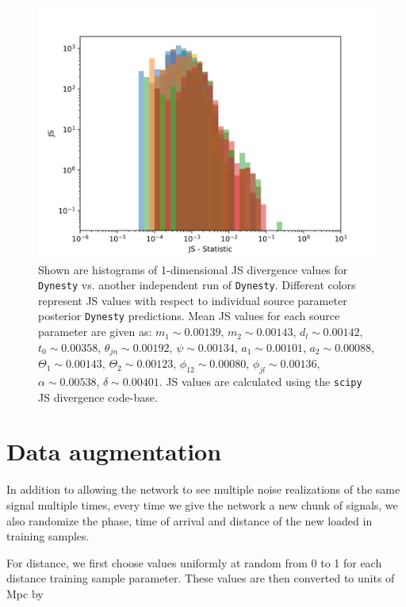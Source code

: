 %
%

\begin{figure}
    \includegraphics[width=\columnwidth]{figures/dynesty-dynesty_indiJS.png}
    \caption[Dynesty vs. Dynesty full 1-D JS divergence histogram plot.]{\label{fig:dyn_vs_dyn_ful14D_JS} Shown are histograms of 1-dimensional JS divergence values for \texttt{Dynesty} vs. another independent run of \texttt{Dynesty}. Different colors represent JS values with respect to individual source parameter posterior \texttt{Dynesty} predictions. Mean JS values for each source parameter are given as: $m_1 \sim 0.00139$, $m_2 \sim 0.00143$, $d_l \sim 0.00142$, $t_0 \sim 0.00358$, $\theta_{jn} \sim 0.00192$, $\psi \sim 0.00134$, $a_1 \sim 0.00101$, $a_2 \sim 0.00088$, $\Theta_1 \sim 0.00143$, $\Theta_2 \sim 0.00123$, $\phi_{12} \sim 0.00080$, $\phi_{jl} \sim 0.00136$, $\alpha \sim 0.00538$, $\delta \sim 0.00401$. JS values are calculated using the \texttt{scipy} JS divergence code-base. }
\end{figure}

\section{Data augmentation}\label{sec:vit_data_aug}

In addition to allowing the network to see multiple noise realizations 
of the same signal multiple times, every time we give the network 
a new chunk of signals, we also randomize the phase, time of arrival and 
distance of the new loaded in training samples.

%
%
For distance, we first choose values uniformly at random from 0 to 1 for 
each distance training sample parameter. These values are then 
converted to units of Mpc by 

